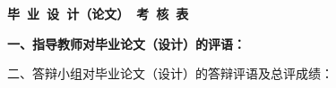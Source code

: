 \cleardoublepage{}
\begin{center}
  \bfseries\fangsong{} 毕~业~设~计（论文）~考~核~表
\end{center}

{
    \bfseries
    \noindent 一、指导教师对毕业论文（设计）的评语：\\
    \vskip 50mm

    \signature{指导教师（签名）}

    \noindent 二、答辩小组对毕业论文（设计）的答辩评语及总评成绩：\\

    \mbox{} \vfill

    \finaleval[10][15][5][62][8][100]
    \signature{答辩小组负责人（签名）}
}